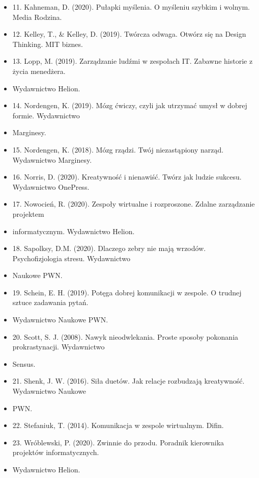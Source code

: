 \documentclass[12pt, a4paper]{article}
\begin{document}
\begin{itemize}
  \item 11. Kahneman, D. (2020). Pułapki myślenia. O myśleniu szybkim i wolnym. Media Rodzina.
  \item 12. Kelley, T., \& Kelley, D. (2019). Twórcza odwaga. Otwórz się na Design Thinking. MIT biznes.
  \item 13. Lopp, M. (2019). Zarządzanie ludźmi w zespołach IT. Zabawne historie z życia menedżera.
  \item Wydawnictwo Helion.
  \item 14. Nordengen, K. (2019). Mózg ćwiczy, czyli jak utrzymać umysł w dobrej formie. Wydawnictwo
  \item Marginesy.
  \item 15. Nordengen, K. (2018). Mózg rządzi. Twój niezastąpiony narząd. Wydawnictwo Marginesy.
  \item 16. Norris, D. (2020). Kreatywność i nienawiść. Twórz jak ludzie sukcesu. Wydawnictwo OnePress.
  \item 17. Nowocień, R. (2020). Zespoły wirtualne i rozproszone. Zdalne zarządzanie projektem
  \item informatycznym. Wydawnictwo Helion.
  \item 18. Sapolksy, D.M. (2020). Dlaczego zebry nie mają wrzodów. Psychofizjologia stresu. Wydawnictwo
  \item Naukowe PWN.
  \item 19. Schein, E. H. (2019). Potęga dobrej komunikacji w zespole. O trudnej sztuce zadawania pytań.
  \item Wydawnictwo Naukowe PWN.
  \item 20. Scott, S. J. (2008). Nawyk nieodwlekania. Proste sposoby pokonania prokrastynacji. Wydawnictwo
  \item Sensus.
  \item 21. Shenk, J. W. (2016). Siła duetów. Jak relacje rozbudzają kreatywność. Wydawnictwo Naukowe
  \item PWN.
  \item 22. Stefaniuk, T. (2014). Komunikacja w zespole wirtualnym. Difin.
  \item 23. Wróblewski, P. (2020). Zwinnie do przodu. Poradnik kierownika projektów informatycznych.
  \item Wydawnictwo Helion.
\end{itemize}
\end{document}
